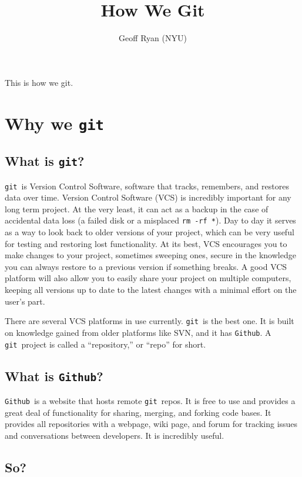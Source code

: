 \documentclass[14pt]{amsart}
\newcommand{\git}{{\texttt{git}}}
\newcommand{\github}{{\texttt{Github}}}
\begin{document}
\title{How We Git}
\author{Geoff Ryan (NYU)}

\maketitle

This is how we git.

\section{Why we \git}

\subsection{What is \git?}

\git\ is Version Control Software, software that tracks, remembers, and restores data over time.  Version Control Software (VCS) is incredibly important for any long term project.  At the very least, it can act as a backup in the case of accidental data loss (a failed disk or a misplaced \texttt{rm -rf *}).  Day to day it serves as a way to look back to older versions of your project, which can be very useful for testing and restoring lost functionality.  At its best, VCS encourages you to make changes to your project, sometimes sweeping ones, secure in the knowledge you can always restore to a previous version if something breaks.  A good VCS platform will also allow you to easily share your project on multiple computers, keeping all versions up to date to the latest changes with a minimal effort on the user's part.

There are several VCS platforms in use currently.  \git\ is the best one.  It is built on knowledge gained from older platforms like SVN, and it has \github .  A \git\ project is called a ``repository,'' or ``repo'' for short.

\subsection{What is \github?}

\github\ is a website that hosts remote \git\ repos.  It is free to use and provides a great deal of functionality for sharing, merging, and forking code bases.  It provides all repositories with a webpage, wiki page, and forum for tracking issues and conversations between developers.  It is incredibly useful.

\subsection{So?}
\end{document}
